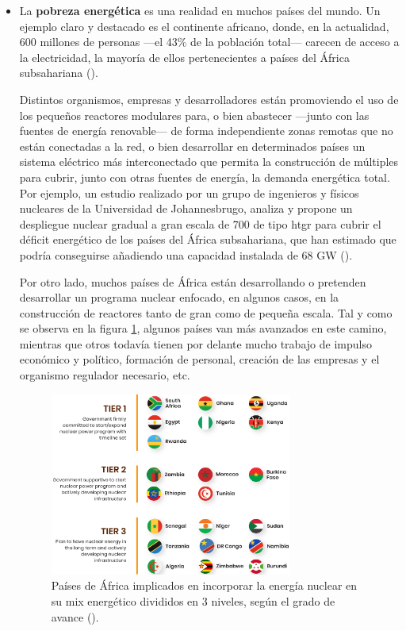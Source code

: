 \begin{itemize}
  \item La \textbf{pobreza energética} es una realidad en muchos países del mundo. Un ejemplo claro y destacado es el continente africano, donde, en la actualidad, 600 millones de personas ---el 43\% de la población total--- carecen de acceso a la electricidad, la mayoría de ellos pertenecientes a países del África subsahariana (\cite{iea_africa}). 
  
  Distintos organismos, empresas y desarrolladores están promoviendo el uso de los pequeños reactores modulares para, o bien abastecer ---junto con las fuentes de energía renovable--- de forma independiente zonas remotas que no están conectadas a la red, o bien desarrollar en determinados países un sistema eléctrico más interconectado que permita la construcción de múltiples  para cubrir, junto con otras fuentes de energía, la demanda energética total. Por ejemplo, un estudio realizado por un grupo de ingenieros y físicos nucleares de la Universidad de Johannesbrugo, analiza y propone un despliegue nuclear gradual a gran escala de 700  de tipo \acrshort{htgr} para cubrir el déficit energético de los países del África subsahariana, que han estimado que podría conseguirse añadiendo una capacidad instalada de 68 GW  (\cite{application_smrs_africa}). 
  
  Por otro lado, muchos países de África están desarrollando o pretenden desarrollar un programa nuclear enfocado, en algunos casos, en la construcción de reactores tanto de gran como de pequeña escala. Tal y como se observa en la figura \ref{fig:africa_nuclear_support}, algunos países van más avanzados en este camino, mientras que otros todavía tienen por delante mucho trabajo de impulso económico y político, formación de personal, creación de las empresas y el organismo regulador necesario, etc.

  \begin{figure}[h]
    \centering
    \includegraphics[width=0.75\textwidth]{content/figures/africa_nuclear_support.png}
    \caption{Países de África implicados en incorporar la energía nuclear en su mix energético divididos en 3 niveles, según el grado de avance (\cite{nba_africa}).}
    \label{fig:africa_nuclear_support}
  \end{figure}


\end{itemize}
